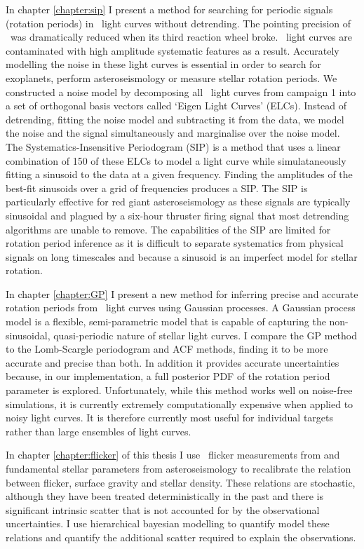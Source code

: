 In chapter \ref{chapter:sip} I present a method for searching for periodic
signals (\eg rotation periods) in \ktwo\ light curves without detrending.
The pointing precision of \kepler\ was dramatically reduced when its third
reaction wheel broke.
\ktwo\ light curves are contaminated with high amplitude systematic features
as a result.
Accurately modelling the noise in these light curves is essential in order to
search for exoplanets, perform asteroseismology or measure stellar rotation
periods.
We constructed a noise model by decomposing all \ktwo\ light curves from
campaign 1 into a set of orthogonal basis vectors called `Eigen Light Curves'
(ELCs).
Instead of detrending, fitting the noise model and subtracting it from the
data, we model the noise and the signal simultaneously and marginalise over
the noise model.
The Systematics-Insensitive Periodogram (SIP) is a method that uses a linear
combination of 150 of these ELCs to model a light curve while simulataneously
fitting a sinusoid to the data at a given frequency.
Finding the amplitudes of the best-fit sinusoids over a grid of frequencies
produces a SIP.
The SIP is particularly effective for red giant asteroseismology as these
signals are typically sinusoidal and plagued by a six-hour thruster firing
signal that most detrending algorithms are unable to remove.
The capabilities of the SIP are limited for rotation period inference as
it is difficult to separate systematics from physical signals on long
timescales and because a sinusoid is an imperfect model for stellar rotation.

In chapter \ref{chapter:GP} I present a new method for inferring precise and
accurate rotation periods from \kepler\ light curves using Gaussian processes.
A Gaussian process model is a flexible, semi-parametric model that is capable
of capturing the non-sinusoidal, quasi-periodic nature of stellar light
curves.
I compare the GP method to the Lomb-Scargle periodogram and ACF methods,
finding it to be more accurate and precise than both.
In addition it provides accurate uncertainties because, in our implementation,
a full posterior PDF of the rotation period parameter is explored.
Unfortunately, while this method works well on noise-free simulations, it is
currently extremely computationally expensive when applied to noisy light
curves.
It is therefore currently most useful for individual targets rather than large
ensembles of light curves.

In chapter \ref{chapter:flicker} of this thesis I use \kepler\ flicker
measurements from \citet{Bastien2013} and fundamental stellar parameters from
asteroseismology to recalibrate the relation between flicker, surface gravity
and stellar density.
These relations are stochastic, although they have been treated
deterministically in the past \citep[\eg][]{Bastien2013, Kipping2014} and
there is significant intrinsic scatter that is not accounted for by the
observational uncertainties.
I use hierarchical bayesian modelling to quantify  model these relations and
quantify the additional scatter required to explain the observations.

